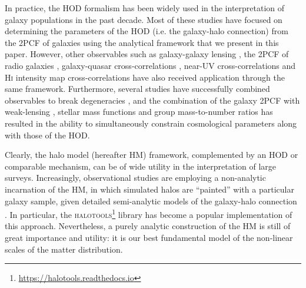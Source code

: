 \documentclass[5p,aas_macros]{elsarticle}
\newcommand{\bd}[1]{\textcolor{purple}{\textbf{[BD: #1]}}}
\begin{document}
In practice, the HOD formalism has been widely used in the interpretation of galaxy populations in the past decade. Most of these studies have focused on determining the parameters of the HOD (i.e. the galaxy-halo connection) from the 2PCF of galaxies \citep[eg.][]{Moustakas2002,Bullock2002,Zheng2004,Zehavi2005,Blake2008,Zehavi2011,Beutler2013,Skibba2015} using the analytical framework that we present in this paper. However, other observables such as galaxy-galaxy lensing \citep{Mandelbaum2006}, the 2PCF of radio galaxies \citep{Wake2008a,Kim2011}, galaxy-quasar cross-correlations \citep{Shen2013}, near-UV cross-correlations \citep{Krause2012} and \textsc{Hi} intensity map cross-correlations \citep{Padmanabhan2016b,Wolz2019} have also received application through the same framework. Furthermore, several studies have successfully combined observables to break degeneracies \citep{Leauthaud2011,Leauthaud2012,More2013}, and the combination of the galaxy 2PCF with weak-lensing \citep{More2015}, stellar mass functions \citep{Coupon2015} and group mass-to-number ratios \citep{Reddick2014} has resulted in the ability to simultaneously constrain cosmological parameters along with those of the HOD.

Clearly, the halo model (hereafter HM) framework, complemented by an HOD or comparable mechanism, can be of wide utility in the interpretation of large surveys.
Increasingly, observational studies are employing a non-analytic incarnation of the HM, in which simulated halos are ``painted'' with a particular galaxy sample, given detailed semi-analytic models of the galaxy-halo connection \citep[eg.][]{Carretero2015}.
In particular, the \textsc{halotools}\footnote{\url{https://halotools.readthedocs.io}} library has become a popular implementation of this approach.
Nevertheless, a purely analytic construction of the HM is still of great importance and utility: it is our best fundamental model of the non-linear scales of the matter distribution.
\end{document}

